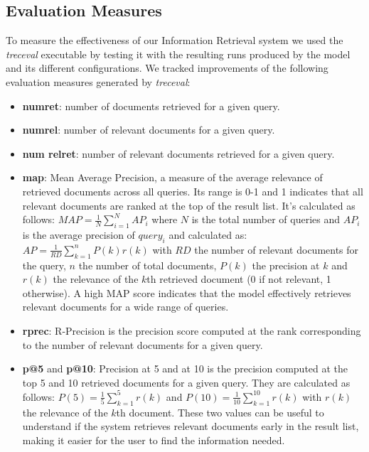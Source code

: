 \subsection{Evaluation Measures}
To measure the effectiveness of our Information Retrieval system we used the \textit{trec\textunderscore eval} executable by testing it with the resulting runs produced by the model and its different configurations.
\newline
We tracked improvements of the following evaluation measures generated by \textit{trec\textunderscore eval}:
\begin{itemize}
	\item \textbf{num\textunderscore ret}: number of documents retrieved for a given query.
	\item \textbf{num\textunderscore rel}: number of relevant documents for a given query.
	\item \textbf{num \textunderscore rel\textunderscore ret}: number of relevant documents retrieved for a given query.
    \item \textbf{map}: Mean Average Precision, a measure of the average relevance of retrieved documents across all queries. Its range is 0-1 and 1 indicates that all relevant documents are ranked at the top of the result list.
    \newline
    It's calculated as follows:
    $MAP = \frac{1}{N} \sum_{i=1}^{N}AP_i$
    where $N$ is the total number of queries and $AP_i$ is the average precision of $query_i$ and calculated as:
    $AP = \frac{1}{RD} \sum_{k=1}^{n}P(k)r(k)$
    with $RD$ the number of relevant documents for the query, $n$ the number of total documents, $P(k)$ the precision at $k$ and $r(k)$ the relevance of the $k$th retrieved document (0 if not relevant, 1 otherwise).
    \newline
    A high MAP score indicates that the model effectively retrieves relevant documents for a wide range of queries.
    \item \textbf{rprec}: R-Precision is the precision score computed at the rank corresponding to the number of relevant documents for a given query.
    \item \textbf{p@5} and \textbf{p@10}: Precision at 5 and at 10 is the precision computed at the top 5 and 10 retrieved documents for a given query.
    They are calculated as follows:
    $P(5) = \frac{1}{5} \sum_{k=1}^{5}r(k)$ and $P(10) = \frac{1}{10} \sum_{k=1}^{10}r(k)$ with $r(k)$ the relevance of the $k$th document.
    \newline
    These two values can be useful to understand if the system retrieves relevant documents early in the result list, making it easier for the user to find the information needed.

\end{itemize}

